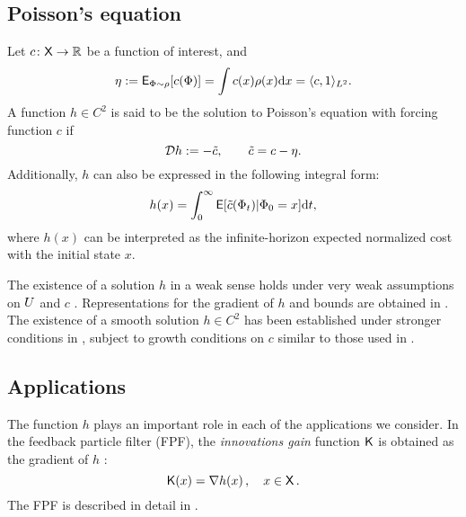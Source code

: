 \subsection{Poisson's equation}
Let $c \colon {\sf X} \to \mathbb{R}$ be a function of interest, and 
\begin{equation}
\eta := {\sf E}_{\Phi \sim \rho}[c(\Phi)] =  \int c(x) \rho(x) \text{d} x = \langle c, 1 \rangle_{L^2}.
\end{equation}
A function $h\in C^2$ is said to be the solution to Poisson's equation with forcing function $c$ if
\begin{equation}
\generate h := - \tilc, \qquad  \tilc = c - \eta.
\label{e:poissons}
\end{equation}
Additionally, $h$ can also be expressed in the following integral form:
\begin{equation}
h(x) =\int_0^\infty {\sf E}[\tilde c(\Phi_t)|\Phi_0 = x] \text{d} t,
\end{equation}
where $h(x)$ can be interpreted as the infinite-horizon expected normalized cost with the initial state $x$. 

The existence of a solution $h$ in a weak sense holds under very weak assumptions on $U$ and $c$  \cite{glymey96a,konmey12a}.   Representations for the gradient of $h$ and bounds are obtained in \cite{laumehmeyrag15,devkonmey17b}.   The existence of  a  smooth solution $h\in C^2$ has been established under stronger conditions in \cite{parver01}, subject to growth conditions on $c$ similar to those used in  \cite{glymey96a}. 

\subsection{Applications} 
The function $h$ plays an important role in each of the applications we consider. In the feedback particle filter (FPF), the \textit{innovations gain} function $\text{\sf K}$ is obtained as  the gradient of $h$ \cite{yanmehmey13}:
\begin{equation}
\kFPF (x) = \nabla h(x)\, ,  \quad x\in\state\, .
\label{e:fpfgain}
\end{equation}
The FPF is described in detail in .

